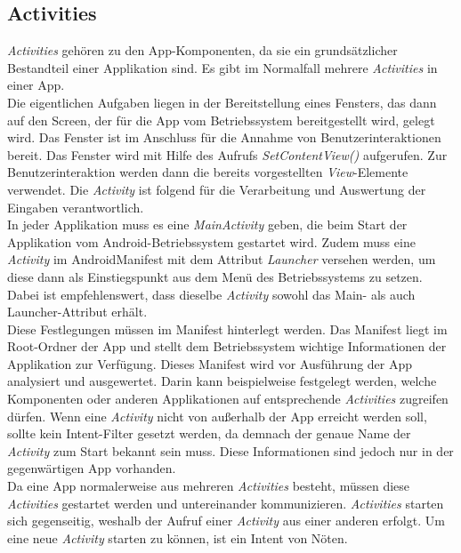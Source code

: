 \subsection{Activities}
\label{ssec:android-activities}
\textit{Activities} gehören zu den App-Komponenten, da sie ein grundsätzlicher Bestandteil einer Applikation sind. Es gibt im Normalfall mehrere \textit{Activities} in einer App.\\
Die eigentlichen Aufgaben liegen in der Bereitstellung eines Fensters, das dann auf den Screen, der für die App vom Betriebssystem bereitgestellt wird, gelegt wird. Das Fenster ist im Anschluss für die Annahme von Benutzerinteraktionen bereit. Das Fenster wird mit Hilfe des Aufrufs \textit{SetContentView()} aufgerufen. Zur Benutzerinteraktion werden dann die bereits vorgestellten \textit{View}-Elemente verwendet. Die \textit{Activity} ist folgend für die Verarbeitung und Auswertung der Eingaben verantwortlich.\\
In jeder Applikation muss es eine \textit{MainActivity} geben, die beim Start der Applikation vom Android-Betriebssystem gestartet wird. Zudem muss eine \textit{Activity} im AndroidManifest mit dem Attribut \textit{Launcher} versehen werden, um diese dann als Einstiegspunkt aus dem Menü des Betriebssystems zu setzen. Dabei ist empfehlenswert, dass dieselbe \textit{Activity} sowohl das Main- als auch Launcher-Attribut erhält.\\
Diese Festlegungen müssen im Manifest hinterlegt werden. Das Manifest liegt im Root-Ordner der App und stellt dem Betriebssystem wichtige Informationen der Applikation zur Verfügung. Dieses Manifest wird vor Ausführung der App analysiert und ausgewertet. Darin kann beispielweise festgelegt werden, welche Komponenten oder anderen Applikationen auf entsprechende \textit{Activities} zugreifen dürfen. Wenn eine \textit{Activity} nicht von außerhalb der App erreicht werden soll, sollte kein Intent-Filter gesetzt werden, da demnach der genaue Name der \textit{Activity} zum Start bekannt sein muss. Diese Informationen sind jedoch nur in der gegenwärtigen App vorhanden.\\
Da eine App normalerweise aus mehreren \textit{Activities} besteht, müssen diese \textit{Activities} gestartet werden und untereinander kommunizieren. \textit{Activities} starten sich gegenseitig, weshalb der Aufruf einer \textit{Activity} aus einer anderen erfolgt. Um eine neue \textit{Activity} starten zu können, ist ein Intent von Nöten.
